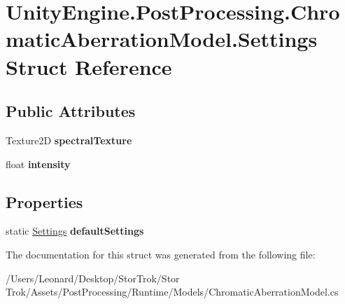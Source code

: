 \hypertarget{struct_unity_engine_1_1_post_processing_1_1_chromatic_aberration_model_1_1_settings}{}\section{Unity\+Engine.\+Post\+Processing.\+Chromatic\+Aberration\+Model.\+Settings Struct Reference}
\label{struct_unity_engine_1_1_post_processing_1_1_chromatic_aberration_model_1_1_settings}
\subsection*{Public Attributes}
\begin{DoxyCompactItemize}
\item 
\mbox{\label{struct_unity_engine_1_1_post_processing_1_1_chromatic_aberration_model_1_1_settings_aff651d22c776d0cb82929551f0b33005}} 
Texture2D {\bfseries spectral\+Texture}
\item 
\mbox{\label{struct_unity_engine_1_1_post_processing_1_1_chromatic_aberration_model_1_1_settings_ac7c815ce4c835bb54ff58e507af198bc}} 
float {\bfseries intensity}
\end{DoxyCompactItemize}
\subsection*{Properties}
\begin{DoxyCompactItemize}
\item 
\mbox{\label{struct_unity_engine_1_1_post_processing_1_1_chromatic_aberration_model_1_1_settings_aed16f622438648f1fa48c1fddb602013}} 
static \hyperlink{struct_unity_engine_1_1_post_processing_1_1_chromatic_aberration_model_1_1_settings}{Settings} {\bfseries default\+Settings}
\end{DoxyCompactItemize}


The documentation for this struct was generated from the following file\+:\begin{DoxyCompactItemize}
\item 
/\+Users/\+Leonard/\+Desktop/\+Stor\+Trok/\+Stor Trok/\+Assets/\+Post\+Processing/\+Runtime/\+Models/Chromatic\+Aberration\+Model.\+cs\end{DoxyCompactItemize}
